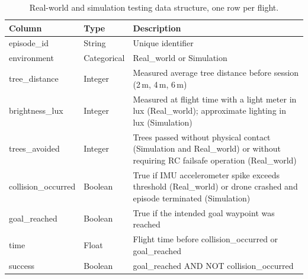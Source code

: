 \begin{table}[H]
    \small
    \centering
    \caption{Real-world and simulation testing data structure, one row per flight.}
    \label{tab:data_structure}
    \begin{tabular}{p{3.5cm} p{2.5cm} p{7cm}}
        \hline\hline
        \rowcolor{lightgray}\textbf{Column} & \textbf{Type} & \textbf{Description} \\\hline
        episode\_id & String & Unique identifier \\
        \rowcolor{lightlightgray} environment & Categorical & Real\_world or Simulation \\
        tree\_distance & Integer & Measured average tree distance before session (2\,m, 4\,m, 6\,m) \\
        \rowcolor{lightlightgray} brightness\_lux & Integer & Measured at flight time with a light meter in lux (Real\_world); approximate lighting in lux (Simulation) \\
        trees\_avoided & Integer & Trees passed without physical contact (Simulation and Real\_world) or without requiring RC failsafe operation (Real\_world) \\
        \rowcolor{lightlightgray} collision\_occurred & Boolean & True if IMU accelerometer spike exceeds threshold (Real\_world) or drone crashed and episode terminated (Simulation) \\
        goal\_reached & Boolean & True if the intended goal waypoint was reached \\
        \rowcolor{lightlightgray} time & Float & Flight time before collision\_occurred or goal\_reached \\
        success & Boolean & goal\_reached AND NOT collision\_occurred \\
        \hline
    \end{tabular}
\end{table}
